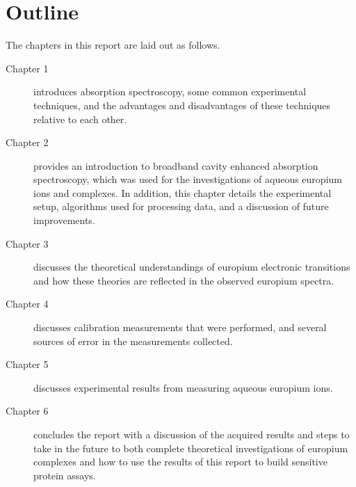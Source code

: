 \section*{Outline}

The chapters in this report are laid out as follows.

\begin{description}
  \item[Chapter 1] introduces absorption spectroscopy, some
    common experimental techniques, and the advantages and disadvantages of
    these techniques relative to each other.
  \item[Chapter 2] provides an introduction to broadband cavity enhanced
    absorption spectroscopy, which was used for the investigations of aqueous
    europium ions and complexes. In addition, this chapter details the
    experimental setup, algorithms used for processing data, and a discussion
    of future improvements.
  \item[Chapter 3] discusses the theoretical understandings of europium
    electronic transitions and how these theories are reflected in the observed
    europium spectra.
  \item[Chapter 4] discusses calibration measurements that were performed, and
    several sources of error in the measurements collected.
  \item[Chapter 5] discusses experimental results from measuring
    aqueous europium ions.
  \item[Chapter 6] concludes the report with a discussion of the acquired
    results and steps to take in the future to both complete theoretical
    investigations of europium complexes and how to use the results of
    this report to build sensitive protein assays.
\end{description}
